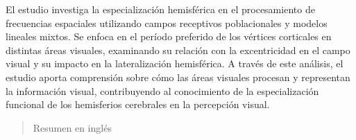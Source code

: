\begin{resumen}
	El estudio investiga la especialización hemisférica en el procesamiento de frecuencias espaciales utilizando campos receptivos poblacionales y modelos lineales mixtos. Se enfoca en el período preferido de los vértices corticales en distintas áreas visuales, examinando su relación con la excentricidad en el campo visual y su impacto en la lateralización hemisférica. A través de este análisis, el estudio aporta comprensión sobre cómo las áreas visuales procesan y representan la información visual, contribuyendo al conocimiento de la especialización funcional de los hemisferios cerebrales en la percepción visual.
	
\end{resumen}

\begin{abstract}
	Resumen en inglés
\end{abstract}